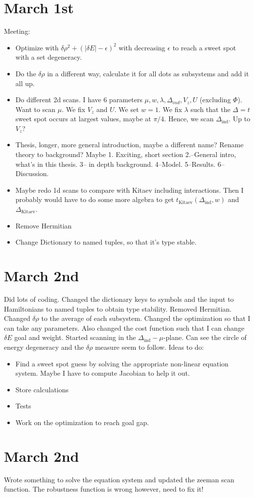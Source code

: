 \documentclass{article}
\begin{document}
\section*{March 1st}
Meeting:
\begin{itemize}
    \item Optimize with $\delta\rho^2 + {(|\delta E| - \epsilon)}^2$ with decreasing $\epsilon$ to reach a sweet spot with a set degeneracy.
    \item Do the $\delta\rho$ in a different way, calculate it for all dots as subsystems and add it all up.
    \item Do different 2d scans. I have 6 parameters $\mu, w, \lambda, \Delta_{ind}, V_z, U$ (excluding $\Phi$). Want to scan $\mu$. We fix $V_z$ and $U$. We set $w=1$. We fix $\lambda$ such that the $\Delta=t$ sweet spot occurs at largest values, maybe at $\pi/4$. Hence, we scan $\Delta_\text{ind}$. Up to $V_z$?
    \item Thesis, longer, more general introduction, maybe a different name? Rename theory to background? Maybe 1. Exciting, short section 2.--General intro, what's in this thesis. 3-- in depth background. 4--Model. 5--Results. 6--Discussion.
    \item Maybe redo 1d scans to compare with Kitaev including interactions. Then I probably would have to do some more algebra to get $t_\text{Kitaev}(\Delta_\text{ind}, w)$ and $\Delta_\text{Kitaev}$. 
    \item Remove Hermitian
    \item Change Dictionary to named tuples, so that it's type stable.
\end{itemize}
\section*{March 2nd}
Did lots of coding. Changed the dictionary keys to symbols and the input to Hamiltonians to named tuples to obtain type stability. Removed Hermitian. Changed $\delta \rho$ to the average of each subsystem. Changed the optimization so that I can take any parameters. Also changed the cost function such that I can change $\delta E$ goal and weight. Started scanning in the $\Delta_\text{ind}-\mu$-plane. Can see the circle of energy degeneracy and the $\delta\rho$ measure seem to follow. Ideas to do:
\begin{itemize}
    \item Find a sweet spot guess by solving the appropriate non-linear equation system. Maybe I have to compute Jacobian to help it out.
    \item Store calculations
    \item Tests
    \item Work on the optimization to reach goal gap.
\end{itemize}
\section*{March 2nd}
Wrote something to solve the equation system and updated the zeeman scan function. The robustness function is wrong however, need to fix it!
\end{document}
